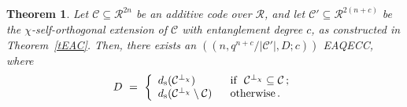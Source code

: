 \documentclass{article}
\newtheorem{thm}{Theorem}[section]
\theoremstyle{remark}
\theoremstyle{definition}
\numberwithin{equation}{section}
\begin{document}
\begin{thm}\label{thm:eaqecc}
Let $\mathcal{C} \subseteq \mathcal{R}^{2n}$ be an additive code over $\mathcal R$,  and let $\mathcal{C}' \subseteq \mathcal{R}^{2(n+c)}$ be the $\chi$-self-orthogonal extension of $\mathcal{C}$ with entanglement degree $c$, as constructed in Theorem~\ref{tEAC}. Then, there  exists an $((n,q^{n+c}/{|\mathcal{C}'|} ,D;c))$ EAQECC,  where
\begin{equation*}D~=~\left\{\begin{array}{ll}
 d_{\mathrm{s}}(\mathcal{C}^{\perp_\chi}) & \text{~~if~~} \mathcal{C}^{\perp_\chi}\subseteq \mathcal{C}\, ;\\
d_{\mathrm{s}}(\mathcal{C}^{\perp_\chi}\setminus \mathcal{C} )  & \text{~~otherwise} \,.
\end{array}\right. \vspace{-1mm}\end{equation*}
\end{thm}
\end{document}
